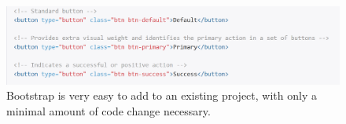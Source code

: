 \documentclass[letterpaper, 12pt]{article}
\begin{document}
\begin{figure}[h]
\centering
\includegraphics{buttonCode.png}
\caption{Bootstrap is very easy to add to an existing project, with only a minimal amount of code change necessary.}
\end{figure}



\end{document}
